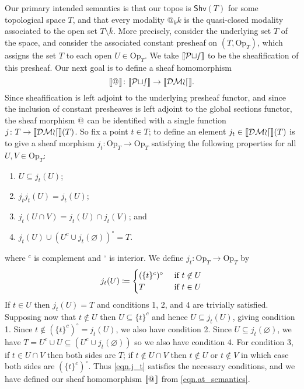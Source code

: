 \documentclass[11pt, oneside, article]{memoir}
\makeatletter
\theoremstyle{plain}
\theoremstyle{definition}
\theoremstyle{remark}
\renewcommand{\ss}{\subseteq}
\DeclarePairedDelimiter{\church}{\llbracket}{\rrbracket}
\newcommand{\Set}[1]{\mathrm{#1}}
\newcommand{\Fun}[1]{\mathsf{#1}}
\newcommand{\tn}[1]{\textnormal{#1}}
\newcommand{\shv}{\Fun{Shv}}
\newcommand{\Op}{\Set{Op}}
\newcommand{\pt}{k}				%
\newcommand{\Pts}{\mathcal{Pts}}		%
\newcommand{\decmod}{\mathcal{DMod}}
\newcommand{\AtSymbol}{{@}}
\newcommand{\At}[1][\pt]{\AtSymbol_{#1}}
\makeatother
\begin{document}
Our primary intended semantics is that our topos is $\shv(T)$ for some topological space $T$, and that every modality $\At{k}$ is the quasi-closed modality associated to the open set $T \setminus \overline{k}$. More precisely, consider the underlying set $T$ of the space, and consider the associated constant presheaf on $(T,\Op_T)$, which assigns the set $T$ to each open $U\in\Op_T$. We take $\church{\Pts}$ to be the sheafification of this presheaf. Our next goal is to define a sheaf homomorphism
\begin{equation}\label{eqn.at_semantics}
	\church{\At[]}\colon\church{\Pts}\to\church{\decmod}.
\end{equation}
Since sheafification is left adjoint to the underlying presheaf functor, and since the inclusion of constant presheaves is left adjoint to the global sections functor, the sheaf morphism $\At[]$ can be identified with a single function $j\colon T\to\church{\decmod}(T)$. So fix a point $t\in T$; to define an element $j_t\in\church{\decmod}(T)$ is to give a sheaf morphism $j_t\colon\Op_T\to\Op_T$ satisfying the following properties for all $U,V\in\Op_T$:
\begin{enumerate}
	\item $U\ss j_t(U)$;
	\item $j_t j_t(U)=j_t(U)$;
	\item $j_t(U\cap V)=j_t(U)\cap j_t(V)$; and
	\item $j_t(U)\cup (U^c\cup j_t(\varnothing))^\circ=T$.
\end{enumerate}
where $^c$ is complement and $^\circ$ is interior. We define $j_t\colon\Op_T\to\Op_T$ by
\begin{equation}\label{eqn.j_t}
	j_t(U)\coloneqq
	\begin{cases}
		(\{t\}^c)^\circ&\tn{ if }t\not\in U\\
		T&\tn{ if } t\in U
	\end{cases}
\end{equation}
If $t\in U$ then $j_t(U)=T$ and conditions 1, 2, and 4 are trivially satisfied. Supposing now that $t\not\in U$ then $U\ss \{t\}^c$ and hence $U\ss j_t(U)$, giving condition 1. Since $t\not\in(\{t\}^c)^\circ=j_t(U)$, we also have condition 2. Since $U\ss j_t(\varnothing)$, we have $T=U^c\cup U\ss (U^c\cup j_t(\varnothing))$ so we also have condition 4. For condition 3, if $t\in U\cap V$ then both sides are $T$; if $t\not\in U\cap V$ then $t\not\in U$ or $t\not\in V$ in which case both sides are $(\{t\}^c)^\circ$. Thus \eqref{eqn.j_t} satisfies the necessary conditions, and we have defined our sheaf homomorphism $\church{\At[]}$ from \eqref{eqn.at_semantics}.
\end{document}
